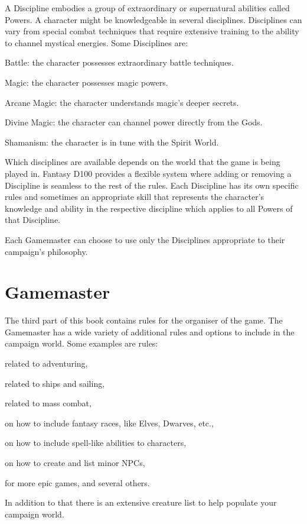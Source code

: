 A Discipline embodies a group of extraordinary or supernatural abilities called Powers. A character might be knowledgeable in several disciplines. Disciplines can vary from special combat techniques that require extensive training to the ability to channel mystical energies. Some Disciplines are:
\begin{rpg-list}
\item Battle: the character possesses extraordinary battle techniques.
\item Magic: the character possesses magic powers.
\item Arcane Magic: the character understands magic's deeper secrets.
\item Divine Magic: the character can channel power directly from the Gods.
\item Shamanism: the character is in tune with the Spirit World.
\end{rpg-list}

Which disciplines are available depends on the world that the game is being played in. Fantasy D100 provides a flexible system where adding or removing a Discipline is seamless to the rest of the rules. Each Discipline has its own specific rules and sometimes an appropriate skill that represents the character's knowledge and ability in the respective discipline which applies to all Powers of that Discipline.

Each Gamemaster can choose to use only the Disciplines appropriate to their campaign's philosophy.


\section{Gamemaster}
The third part of this book contains rules for the organiser of the game. The Gamemaster has a wide variety of additional rules and options to include in the campaign world. Some examples are rules:
\begin{rpg-list}
\item related to adventuring,
\item related to ships and sailing,
\item related to mass combat,
\item on how to include fantasy races, like Elves, Dwarves, etc.,
\item on how to include spell-like abilities to characters,
\item on how to create and list minor NPCs,
\item for more epic games, and several others.
\end{rpg-list}

In addition to that there is an extensive creature list to help populate your campaign world.

